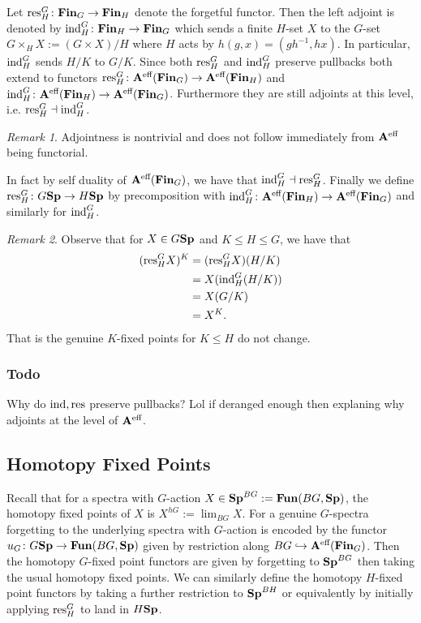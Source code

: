 \documentclass[letterpaper]{article}
\theoremstyle{definition}
\theoremstyle{remark}
\newtheorem{remark}{Remark}
\theoremstyle{plain}
\begin{document}
Let $\textnormal{res}^G_H\colon\mathbf{Fin}_G\rightarrow\mathbf{Fin}_H$ denote the forgetful functor. Then the left adjoint is denoted by $\textnormal{ind}^G_H\colon\mathbf{Fin}_H\rightarrow\mathbf{Fin}_G$ which sends a finite $H$-set $X$ to the $G$-set $G\times_H X:= (G\times X)/H$ where $H$ acts by $h(g,x)=(gh^{-1},hx)$. In particular, $\textnormal{ind}^G_H$ sends $H/K$ to $G/K$. Since both $\textnormal{res}^G_H$ and $\textnormal{ind}^G_H$ preserve pullbacks both extend to functors $\textnormal{res}^G_H\colon\mathbf{A}^\textnormal{eff}(\mathbf{Fin}_G)\rightarrow\mathbf{A}^\textnormal{eff}(\mathbf{Fin}_H)$ and $\textnormal{ind}^G_H\colon\mathbf{A}^\textnormal{eff}(\mathbf{Fin}_H)\rightarrow\mathbf{A}^\textnormal{eff}(\mathbf{Fin}_G)$. Furthermore they are still adjoints at this level, i.e. $\textnormal{res}^G_H\dashv\textnormal{ind}^G_H$.

\begin{remark}
		Adjointness is nontrivial and does not follow immediately from $\mathbf{A}^\textnormal{eff}$ being functorial.
\end{remark}

In fact by self duality of $\mathbf{A}^\textnormal{eff}(\mathbf{Fin}_G)$, we have that $\textnormal{ind}^G_H\dashv\textnormal{res}^G_H$. Finally we define $\textnormal{res}^G_H\colon G\mathbf{Sp}\rightarrow H\mathbf{Sp}$ by precomposition with $\textnormal{ind}^G_H\colon\mathbf{A}^\textnormal{eff}(\mathbf{Fin}_H)\rightarrow\mathbf{A}^\textnormal{eff}(\mathbf{Fin}_G)$ and similarly for $\textnormal{ind}^G_H$.	

\begin{remark}
		Observe that for $X\in G\mathbf{Sp}$ and $K\leq H\leq G$, we have that
		\begin{align*}
				(\textnormal{res}^G_H X)^K &= (\textnormal{res}^G_H X)(H/K)\\
							&= X(\textnormal{ind}^G_H(H/K))\\
							&= X(G/K)\\
							&= X^K.
		\end{align*}
		That is the genuine $K$-fixed points for $K\leq H$ do not change.
\end{remark}

\subsubsection*{Todo}
\begin{outline}
		\1 Why do $\textnormal{ind},\textnormal{res}$ preserve pullbacks?
		\1 Lol if deranged enough then explaning why adjoints at the level of $\mathbf{A}^\textnormal{eff}$.
\end{outline}

\subsection{Homotopy Fixed Points}

Recall that for a spectra with $G$-action $X\in\mathbf{Sp}^{BG}:=\mathbf{Fun}(BG,\mathbf{Sp})$, the homotopy fixed points of $X$ is $X^{hG}:=\lim_{BG}X$. For a genuine $G$-spectra forgetting to the underlying spectra with $G$-action is encoded by the functor $u_G\colon G\mathbf{Sp}\rightarrow\mathbf{Fun}(BG,\mathbf{Sp})$ given by restriction along $BG\hookrightarrow\mathbf{A}^\textnormal{eff}(\mathbf{Fin}_G)$. Then the homotopy $G$-fixed point functors are given by forgetting to $\mathbf{Sp}^{BG}$ then taking the usual homotopy fixed points. We can similarly define the homotopy $H$-fixed point functors by taking a further restriction to $\mathbf{Sp}^{BH}$ or equivalently by initially applying $\textnormal{res}^G_H$ to land in $H\mathbf{Sp}$.
\end{document}
